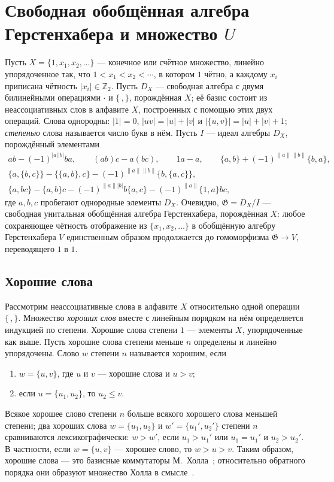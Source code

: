 \documentclass[11pt,reqno]{amsart}
\newcommand{\Z}{\mathbb Z}
\newcommand{\G}{\mathfrak G}
\newcommand{\rp}[1]{\|#1\|}
\theoremstyle{plain}
\theoremstyle{definition}
\theoremstyle{remark}
\begin{document}
\section{Свободная обобщённая алгебра Герстенхабера и множество \texorpdfstring{$U$}{U}}\label{sec:free}

Пусть $X=\{1,x_1,x_2,\dots\}$ --- конечное или счётное множество, линейно упорядоченное так, что $1<x_1<x_2<\cdots$, в котором $1$ чётно, а каждому $x_i$ приписана чётность $|x_i|\in\Z_2$.
Пусть $D_X$ --- свободная алгебра с двумя билинейными операциями $\cdot$ и $\{\,,\}$, порождённая $X$; её базис состоит из неассоциативных слов в алфавите $X$, построенных с помощью этих двух операций.
Слова однородны: $|1|=0$, $|uv|=|u|+|v|$ и $|\{u,v\}|=|u|+|v|+1$; \emph{степенью} слова называется число букв в нём.
Пусть $I$ --- идеал алгебры $D_X$, порождённый элементами
\begin{gather*}
ab-(-1)^{|a||b|}ba,\qquad (ab)c-a(bc),\qquad 1a-a,\qquad \{a,b\}+(-1)^{\rp a\rp b}\{b,a\},\\
\{a,\{b,c\}\}-\{\{a,b\},c\}-(-1)^{\rp a\rp b}\{b,\{a,c\}\},\\
\{a,bc\}-\{a,b\}c-(-1)^{\rp a|b|}b\{a,c\}-(-1)^{\rp a}\{1,a\}bc,
\end{gather*}
где $a,b,c$ пробегают однородные элементы $D_X$.
Очевидно, $\G=D_X/I$ --- свободная унитальная обобщённая алгебра Герстенхабера, порождённая $X$: любое сохраняющее чётность отображение из $\{x_1,x_2,\dots\}$ в обобщённую алгебру Герстенхабера $V$ единственным образом продолжается до гомоморфизма $\G\to V$, переводящего $1$ в $1$.

\subsection*{Хорошие слова}
Рассмотрим неассоциативные слова в алфавите $X$ относительно одной операции $\{\,,\}$.
Множество \emph{хороших слов} вместе с линейным порядком на нём определяется индукцией по степени.
Хорошие слова степени $1$ --- элементы $X$, упорядоченные как выше.
Пусть хорошие слова степени меньше $n$ определены и линейно упорядочены.
Слово $w$ степени $n$ называется хорошим, если
\begin{enumerate}
\item[(1)] $w=\{u,v\}$, где $u$ и $v$ --- хорошие слова и $u>v$;
\item[(2)] если $u=\{u_1,u_2\}$, то $u_2\le v$.
\end{enumerate}
Всякое хорошее слово степени $n$ больше всякого хорошего слова меньшей степени; два хороших слова $w=\{u_1,u_2\}$ и $w'=\{u_1',u_2'\}$ степени $n$ сравниваются лексикографически: $w>w'$, если $u_1>u_1'$ или $u_1=u_1'$ и $u_2>u_2'$.
В частности, если $w=\{u,v\}$ --- хорошее слово, то $w>u>v$.
Таким образом, хорошие слова --- это базисные коммутаторы М.~Холла~\cite{Hall50}; относительно обратного порядка они образуют множество Холла в смысле~\cite[раздел~4.1]{Reu93}.
\end{document}
